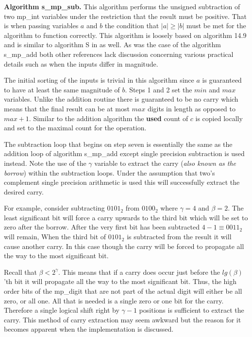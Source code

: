 \documentclass[b5paper]{book}
\begin{document}
\textbf{Algorithm s\_mp\_sub.}
This algorithm performs the unsigned subtraction of two mp\_int variables under the restriction that the result must be positive.  That is when
passing variables $a$ and $b$ the condition that $\vert a \vert \ge \vert b \vert$ must be met for the algorithm to function correctly.  This
algorithm is loosely based on algorithm 14.9 \cite[pp. 595]{HAC} and is similar to algorithm S in \cite[pp. 267]{TAOCPV2} as well.  As was the case
of the algorithm s\_mp\_add both other references lack discussion concerning various practical details such as when the inputs differ in magnitude.

The initial sorting of the inputs is trivial in this algorithm since $a$ is guaranteed to have at least the same magnitude of $b$.  Steps 1 and 2 
set the $min$ and $max$ variables.  Unlike the addition routine there is guaranteed to be no carry which means that the final result can be at 
most $max$ digits in length as opposed to $max + 1$.  Similar to the addition algorithm the \textbf{used} count of $c$ is copied locally and 
set to the maximal count for the operation.

The subtraction loop that begins on step seven is essentially the same as the addition loop of algorithm s\_mp\_add except single precision 
subtraction is used instead.  Note the use of the $\gamma$ variable to extract the carry (\textit{also known as the borrow}) within the subtraction 
loops.  Under the assumption that two's complement single precision arithmetic is used this will successfully extract the desired carry.  

For example, consider subtracting $0101_2$ from $0100_2$ where $\gamma = 4$ and $\beta = 2$.  The least significant bit will force a carry upwards to 
the third bit which will be set to zero after the borrow.  After the very first bit has been subtracted $4 - 1 \equiv 0011_2$ will remain,  When the 
third bit of $0101_2$ is subtracted from the result it will cause another carry.  In this case though the carry will be forced to propagate all the 
way to the most significant bit.  

Recall that $\beta < 2^{\gamma}$.  This means that if a carry does occur just before the $lg(\beta)$'th bit it will propagate all the way to the most 
significant bit.  Thus, the high order bits of the mp\_digit that are not part of the actual digit will either be all zero, or all one. All that
is needed is a single zero or one bit for the carry.  Therefore a single logical shift right by $\gamma - 1$ positions is sufficient to extract the 
carry.  This method of carry extraction may seem awkward but the reason for it becomes apparent when the implementation is discussed.  
\end{document}

